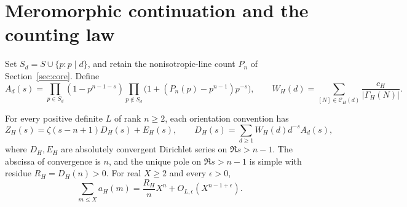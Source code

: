 \section{Meromorphic continuation and the counting law}\label{sec:analytic}
Set $S_d=S\cup\{p:p\mid d\}$, and retain the nonisotropic-line
count $P_n$ of Section~\ref{sec:core}. Define
\[
 A_d(s)=\prod_{p\in S_d}(1-p^{n-1-s})
         \prod_{p\notin S_d}\bigl(1+(P_n(p)-p^{n-1})p^{-s}\bigr),\qquad
 W_H(d)=\sum_{[N]\in\mathcal C_H(d)}\frac{c_H}{|\Gamma_H(N)|}.
\]
\begin{theorem}\label{th:analytic}
For every positive definite $L$ of rank $n\ge2$, each orientation convention has
\[
 Z_H(s)=\zeta(s-n+1)D_H(s)+E_H(s),\qquad
 D_H(s)=\sum_{d\ge1}W_H(d)d^{-s}A_d(s),
\]
where $D_H,E_H$ are absolutely convergent Dirichlet series on $\Re s>n-1$. The abscissa of convergence is $n$, and the unique pole on $\Re s>n-1$ is simple with residue $R_H=D_H(n)>0$. For real $X\ge2$ and every $\epsilon>0$,
\[
 \sum_{m\le X}a_H(m)=\frac{R_H}{n}X^n+O_{L,\epsilon}(X^{n-1+\epsilon}).
\]
\end{theorem}
